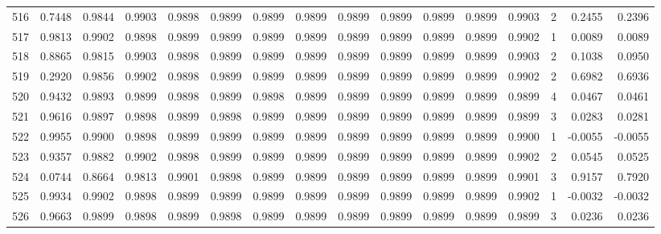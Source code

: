 \begin{tabular}{lrrrrrrrrrrrrrrr}
516 &      0.7448 &  0.9844 &  0.9903 &  0.9898 &  0.9899 &  0.9899 &  0.9899 &  0.9899 &  0.9899 &  0.9899 &   0.9899 &     0.9903 &      2 &                    0.2455 &                     0.2396 \\
517 &      0.9813 &  0.9902 &  0.9898 &  0.9899 &  0.9899 &  0.9899 &  0.9899 &  0.9899 &  0.9899 &  0.9899 &   0.9899 &     0.9902 &      1 &                    0.0089 &                     0.0089 \\
518 &      0.8865 &  0.9815 &  0.9903 &  0.9898 &  0.9899 &  0.9899 &  0.9899 &  0.9899 &  0.9899 &  0.9899 &   0.9899 &     0.9903 &      2 &                    0.1038 &                     0.0950 \\
519 &      0.2920 &  0.9856 &  0.9902 &  0.9898 &  0.9899 &  0.9899 &  0.9899 &  0.9899 &  0.9899 &  0.9899 &   0.9899 &     0.9902 &      2 &                    0.6982 &                     0.6936 \\
520 &      0.9432 &  0.9893 &  0.9899 &  0.9898 &  0.9899 &  0.9898 &  0.9899 &  0.9899 &  0.9899 &  0.9899 &   0.9899 &     0.9899 &      4 &                    0.0467 &                     0.0461 \\
521 &      0.9616 &  0.9897 &  0.9898 &  0.9899 &  0.9898 &  0.9899 &  0.9899 &  0.9899 &  0.9899 &  0.9899 &   0.9899 &     0.9899 &      3 &                    0.0283 &                     0.0281 \\
522 &      0.9955 &  0.9900 &  0.9898 &  0.9899 &  0.9899 &  0.9899 &  0.9899 &  0.9899 &  0.9899 &  0.9899 &   0.9899 &     0.9900 &      1 &                   -0.0055 &                    -0.0055 \\
523 &      0.9357 &  0.9882 &  0.9902 &  0.9898 &  0.9899 &  0.9899 &  0.9899 &  0.9899 &  0.9899 &  0.9899 &   0.9899 &     0.9902 &      2 &                    0.0545 &                     0.0525 \\
524 &      0.0744 &  0.8664 &  0.9813 &  0.9901 &  0.9898 &  0.9899 &  0.9899 &  0.9899 &  0.9899 &  0.9899 &   0.9899 &     0.9901 &      3 &                    0.9157 &                     0.7920 \\
525 &      0.9934 &  0.9902 &  0.9898 &  0.9899 &  0.9899 &  0.9899 &  0.9899 &  0.9899 &  0.9899 &  0.9899 &   0.9899 &     0.9902 &      1 &                   -0.0032 &                    -0.0032 \\
526 &      0.9663 &  0.9899 &  0.9898 &  0.9899 &  0.9898 &  0.9899 &  0.9899 &  0.9899 &  0.9899 &  0.9899 &   0.9899 &     0.9899 &      3 &                    0.0236 &                     0.0236 \\

\end{tabular}

